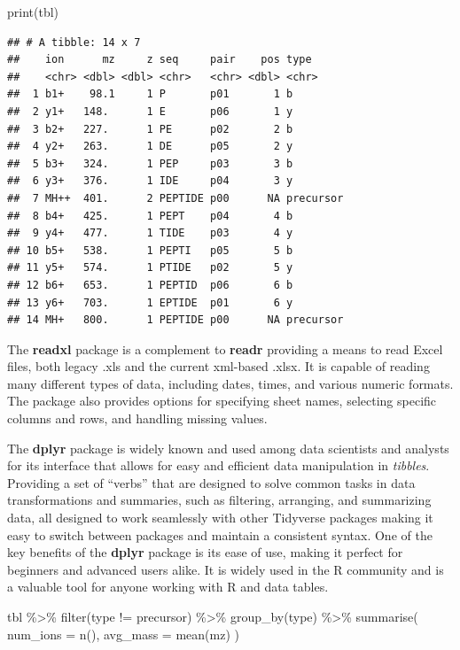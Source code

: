 \documentclass[
]{book}
\newenvironment{Shaded}{\begin{snugshade}}{\end{snugshade}}
\newcommand{\AttributeTok}[1]{\textcolor[rgb]{0.77,0.63,0.00}{#1}}
\newcommand{\FunctionTok}[1]{\textcolor[rgb]{0.00,0.00,0.00}{#1}}
\newcommand{\NormalTok}[1]{#1}
\newcommand{\SpecialCharTok}[1]{\textcolor[rgb]{0.00,0.00,0.00}{#1}}
\newcommand{\StringTok}[1]{\textcolor[rgb]{0.31,0.60,0.02}{#1}}
\begin{document}
\begin{Shaded}
\begin{Highlighting}[]
\FunctionTok{print}\NormalTok{(tbl)}
\end{Highlighting}
\end{Shaded}

\begin{verbatim}
## # A tibble: 14 x 7
##    ion      mz     z seq     pair    pos type     
##    <chr> <dbl> <dbl> <chr>   <chr> <dbl> <chr>    
##  1 b1+    98.1     1 P       p01       1 b        
##  2 y1+   148.      1 E       p06       1 y        
##  3 b2+   227.      1 PE      p02       2 b        
##  4 y2+   263.      1 DE      p05       2 y        
##  5 b3+   324.      1 PEP     p03       3 b        
##  6 y3+   376.      1 IDE     p04       3 y        
##  7 MH++  401.      2 PEPTIDE p00      NA precursor
##  8 b4+   425.      1 PEPT    p04       4 b        
##  9 y4+   477.      1 TIDE    p03       4 y        
## 10 b5+   538.      1 PEPTI   p05       5 b        
## 11 y5+   574.      1 PTIDE   p02       5 y        
## 12 b6+   653.      1 PEPTID  p06       6 b        
## 13 y6+   703.      1 EPTIDE  p01       6 y        
## 14 MH+   800.      1 PEPTIDE p00      NA precursor
\end{verbatim}

The \textbf{readxl} package is a complement to \textbf{readr} providing a means to read Excel files, both legacy .xls and the current xml-based .xlsx. It is capable of reading many different types of data, including dates, times, and various numeric formats. The package also provides options for specifying sheet names, selecting specific columns and rows, and handling missing values.

The \textbf{dplyr} package is widely known and used among data scientists and analysts for its interface that allows for easy and efficient data manipulation in \emph{tibbles}. Providing a set of ``verbs'' that are designed to solve common tasks in data transformations and summaries, such as filtering, arranging, and summarizing data, all designed to work seamlessly with other Tidyverse packages making it easy to switch between packages and maintain a consistent syntax. One of the key benefits of the \textbf{dplyr} package is its ease of use, making it perfect for beginners and advanced users alike. It is widely used in the R community and is a valuable tool for anyone working with R and data tables.

\begin{Shaded}
\begin{Highlighting}[]
\NormalTok{tbl }\SpecialCharTok{\%\textgreater{}\%} 
  \FunctionTok{filter}\NormalTok{(type }\SpecialCharTok{!=} \StringTok{\textquotesingle{}precursor\textquotesingle{}}\NormalTok{) }\SpecialCharTok{\%\textgreater{}\%} 
  \FunctionTok{group\_by}\NormalTok{(type) }\SpecialCharTok{\%\textgreater{}\%}
  \FunctionTok{summarise}\NormalTok{(}
    \AttributeTok{num\_ions =} \FunctionTok{n}\NormalTok{(),}
    \AttributeTok{avg\_mass =} \FunctionTok{mean}\NormalTok{(mz)}
\NormalTok{  )}
\end{Highlighting}
\end{Shaded}
\end{document}
